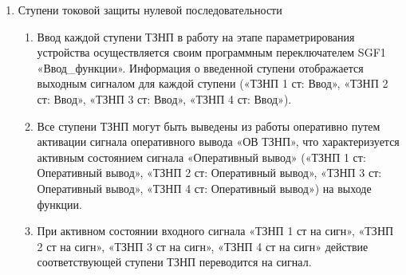 \begin{enumerate}
\begin{enumerate}
\item
В составе функционального блока «ТЗНП» предусмотрены следующие функции:
\begin{itemize}
\item четыре независимые направленные/ненаправленные ступени -- функции «ТЗНП 1 ст.», «ТЗНП 2 ст.», «ТЗНП 3 ст.», «ТЗНП 4 ст.»;
\item блокировка при броске намагничивающего тока -- функция «БНТ»;
\item орган направления мощности нулевой последовательности -- функция «ОНМ НП».
\end{itemize}

\item
Функциональный блок «ТЗНП» может быть полностью выведен из работы оперативно путем активации сигнала «ОВ ТЗНП».

\item
В таблице \ref{tznp:tbl1} приведены параметры, необходимые для настройки ТЗНП.

\end{enumerate}


\item Ступени токовой защиты нулевой последовательности

\begin{enumerate}

\item
Ввод каждой ступени ТЗНП в работу на этапе параметрирования устройства осуществляется своим программным переключателем SGF1 «Ввод\_функции». Информация о введенной ступени отображается выходным сигналом для каждой ступени («ТЗНП 1 ст: Ввод», «ТЗНП 2 ст: Ввод», «ТЗНП 3 ст: Ввод», «ТЗНП 4 ст: Ввод»).

\item
Все ступени ТЗНП могут быть выведены из работы оперативно путем активации сигнала оперативного вывода «ОВ ТЗНП», что характеризуется активным состоянием сигнала «Оперативный вывод» («ТЗНП 1 ст: Оперативный вывод», «ТЗНП 2 ст: Оперативный вывод», «ТЗНП 3 ст: Оперативный вывод», «ТЗНП 4 ст: Оперативный вывод») на выходе функции.

\item
При активном состоянии входного сигнала «ТЗНП 1 ст на сигн», «ТЗНП 2 ст на сигн», «ТЗНП 3 ст на сигн», «ТЗНП 4 ст на сигн» действие соответствующей ступени ТЗНП переводится на сигнал.


\end{enumerate}
\end{enumerate}
